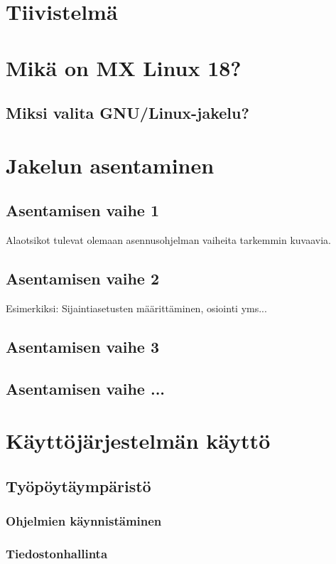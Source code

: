 \documentclass[a4paper, 12pt, finnish]{article}
\begin{document}
\thispagestyle{empty} %
\section{Tiivistelmä}

\section{Mikä on MX Linux 18?}
\subsection{Miksi valita GNU/Linux-jakelu?}

\section{Jakelun asentaminen}
\subsection{Asentamisen vaihe 1}
Alaotsikot tulevat olemaan asennusohjelman vaiheita tarkemmin kuvaavia.
\subsection{Asentamisen vaihe 2}
Esimerkiksi: Sijaintiasetusten määrittäminen, osiointi yms...

\subsection{Asentamisen vaihe 3}
\subsection{Asentamisen vaihe ...}
\section{Käyttöjärjestelmän käyttö}

\subsection{Työpöytäympäristö}

\subsubsection{Ohjelmien käynnistäminen}

\subsubsection{Tiedostonhallinta}
\end{document}
